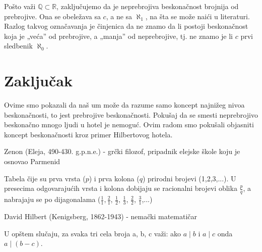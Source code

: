 \documentclass[a4paper]{article}
\begin{document}
Pošto važi $\mathbb{Q}\subset \mathbb{R}$, zaključujemo da je neprebrojiva beskonačnost brojnija od prebrojive. Ona se obeležava sa $c$, a ne sa $\aleph_{1}$, na šta se može naići u literaturi. Razlog takvog označavanja je činjenica da ne znamo da li postoji beskonačnost koja je „veća” od prebrojive, a „manja” od neprebrojive, tj. ne znamo je li $c$ prvi sledbenik $\aleph_{0}$.\\

\section{Zaključak}
\label{poglavlje:Zaključak}
Ovime smo pokazali da naš um može da razume samo koncept najnižeg nivoa beskonačnosti, to jest prebrojive beskonačnosti.
Pokušaj da se smesti neprebrojivo beskonačno mnogo ljudi u hotel je nemoguć. Ovim radom smo pokušali objasniti koncept beskonačnosti kroz primer Hilbertovog hotela.


\appendix
{}
\renewcommand{\refname}{Dodatak: objašnjenja}
\begin{thebibliography}{9}

 Zenon (Eleja, 490-430. g.p.n.e.) - grčki filozof, pripadnik elejske škole koju je osnovao Parmenid

 Tabela čije su prva vrsta ($p$) i prva kolona ($q$) prirodni brojevi (1,2,3,...). U presecima odgovarajućih vrsta i kolona dobijaju se racionalni brojevi oblika $\frac{p}{q}$, a nabrajaju se po dijagonalama ($\frac{1}{1}, \frac{2}{1}$, $\frac{1}{2}$, $\frac{1}{3}$, $\frac{2}{2}$, $\frac{3}{1}$,...)

 David Hilbert (Kenigsberg, 1862-1943) - nemački matematičar

U opštem slučaju, za svaka tri cela broja a, b, c važi: ako $a \mid b$ i $a \mid c$ onda $a \mid (b - c)$.




\end{thebibliography}

\appendix
{}

\renewcommand{\refname}{Literatura}
\begin{thebibliography}{9}


\end{thebibliography}
\end{document}
